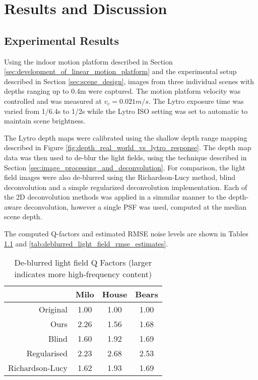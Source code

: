 
\chapter{Results and Discussion}
\label{chap:results_and_discussion}

\section{Experimental Results}
\label{sec:experimental_results}

Using the indoor motion platform described in Section \ref{sec:development_of_linear_motion_platform} and the experimental setup described in Section \ref{sec:scene_design}, images from three individual scenes with depths ranging up to \nicetilde0.4m were captured.
The motion platform velocity was controlled and was measured at $v_c = 0.021m/s$.
The Lytro exposure time was varied from 1/6.4s to 1/2s while the Lytro ISO setting was set to automatic to maintain scene brightness.

The Lytro depth maps were calibrated using the shallow depth range mapping described in Figure \ref{fig:depth_real_world_vs_lytro_response}.
The depth map data was then used to de-blur the light fields, using the technique described in Section \ref{sec:image_processing_and_deconvolution}.
For comparison, the light field images were also de-blurred using the Richardson-Lucy method, blind deconvolution and a simple regularized deconvolution implementation.
Each of the 2D deconvolution methods was applied in a simmilar manner to the depth-aware deconvolution, however a single PSF was used, computed at the median scene depth.

The computed Q-factors and estimated RMSE noise levels are shown in Tables \ref{tab:deblurred_light_field_q_factors} and \ref{tab:deblurred_light_field_rmse_estimates}.


\begin{table}[h]
\centering
\caption[De-blurred light field Q Factors]{De-blurred light field Q Factors (larger indicates more high-frequency content)}
\label{tab:deblurred_light_field_q_factors}
\begin{tabular}[h]{r | c c c}
                & Milo & House & Bears \\
\hline
Original        & 1.00 & 1.00  & 1.00 \\
Ours            & 2.26 & 1.56  & 1.68 \\
Blind           & 1.60 & 1.92  & 1.69 \\
Regularised     & 2.23 & 2.68  & 2.53 \\
Richardson-Lucy & 1.62 & 1.93  & 1.69 \\
\end{tabular}
\end{table}


